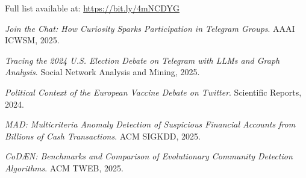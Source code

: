 
\begin{cvparagraph}
Full list available at: \url{https://bit.ly/4mNCDYG}
\end{cvparagraph}

{
\small
\begin{cvitems}
  \item {\textit{Join the Chat: How Curiosity Sparks Participation in Telegram Groups}. AAAI ICWSM, 2025.}
  \item {\textit{Tracing the 2024 U.S. Election Debate on Telegram with LLMs and Graph Analysis}. Social Network Analysis and Mining, 2025.}
  \item {\textit{Political Context of the European Vaccine Debate on Twitter}. Scientific Reports, 2024.}
  \item {\textit{MAD: Multicriteria Anomaly Detection of Suspicious Financial Accounts from Billions of Cash Transactions}. ACM SIGKDD, 2025.}
  \item {\textit{CoDÆN: Benchmarks and Comparison of Evolutionary Community Detection Algorithms}. ACM TWEB, 2025.}

\end{cvitems}
}



